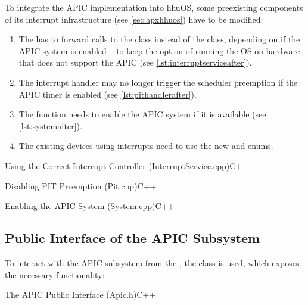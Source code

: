 To integrate the APIC implementation into hhuOS, some preexisting components of its interrupt infrastructure (see \autoref{sec:apxhhuos}) have to be modified:

\begin{enumerate}
  \item The  has to forward calls to the  class instead of the  class, depending on if the APIC system is enabled -- to keep the option of running the OS on hardware that does not support the APIC (see \autoref{lst:interruptserviceafter}).
  \item The  interrupt handler may no longer trigger the scheduler preemption if the APIC timer is enabled (see \autoref{lst:pithandlerafter}).
  \item The  function needs to enable the APIC system if it is available (see \autoref{lst:systemafter}).
  \item The existing devices using interrupts need to use the new  and  enums.
\end{enumerate}

\begin{codeblock}[label=lst:interruptserviceafter]{Using the Correct Interrupt Controller (InterruptService.cpp)}{C++}
\end{codeblock}

\begin{codeblock}[label=lst:pithandlerafter]{Disabling PIT Preemption (Pit.cpp)}{C++}
\end{codeblock}

\begin{codeblock}[label=lst:systemafter]{Enabling the APIC System (System.cpp)}{C++}
\end{codeblock}

\subsection{Public Interface of the APIC Subsystem}
\label{subsec:hhuospublicinterface}

To interact with the APIC subsystem from the , the  class is used, which exposes the necessary functionality:

\begin{codeblock}{The APIC Public Interface (Apic.h)}{C++}
\end{codeblock}

